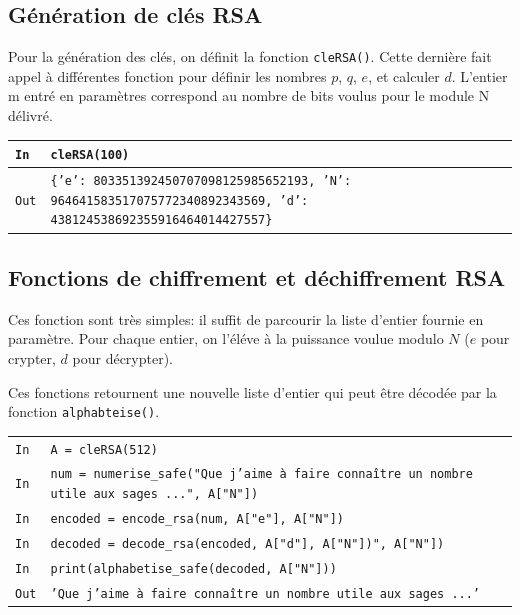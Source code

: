 \documentclass[titlepage]{article}
\begin{document}
    \subsection{Génération de clés RSA}
    Pour la génération des clés, on définit la fonction \texttt{cleRSA()}. Cette dernière fait appel à différentes fonction pour définir les nombres $p$, $q$, $e$, et calculer $d$.
    L'entier m entré en paramètres correspond au nombre de bits voulus pour le module N délivré.

    
    

    \begin{tabularx}{12cm}{|p{0.60cm}|X|}
        \hline
        \rowcolor{gray}
        \texttt{In}
        & 
        \texttt{cleRSA(100)}
        \\
        \hline
        \texttt{Out}
        &
        \texttt{\{'e': 803351392450707098125985652193,\newline
        'N': 964641583517075772340892343569,\newline
        'd': 438124538692355916464014427557\}}
        \\
        \hline
    \end{tabularx}
    \bigbreak

    \subsection{Fonctions de chiffrement et déchiffrement RSA}
    Ces fonction sont très simples: il suffit de parcourir la liste d'entier fournie en paramètre. Pour chaque entier, on l'éléve à la puissance voulue modulo $N$ ($e$ pour crypter, $d$ pour décrypter).

    

    

    Ces fonctions retournent une nouvelle liste d'entier qui peut être décodée par la fonction \texttt{alphabteise()}.

    \begin{tabularx}{12cm}{|p{0.60cm}|X|}
        \hline
        \rowcolor{gray} \texttt{In} & \texttt{A = cleRSA(512)} \\
        \rowcolor{gray} \texttt{In} & \texttt{num = numerise\_safe("Que j’aime à faire connaître un nombre utile aux sages ...", A["N"])} \\
        \rowcolor{gray} \texttt{In} & \texttt{encoded = encode\_rsa(num, A["e"], A["N"])} \\
        \rowcolor{gray} \texttt{In} & \texttt{decoded = decode\_rsa(encoded, A["d"], A["N"])", A["N"])} \\
        \rowcolor{gray} \texttt{In} & \texttt{print(alphabetise\_safe(decoded, A["N"]))} \\
        \hline
        \texttt{Out} & \texttt{'Que j’aime à faire connaître un nombre utile aux sages ...'} \\
        \hline
    \end{tabularx}
    \bigbreak
\end{document}
